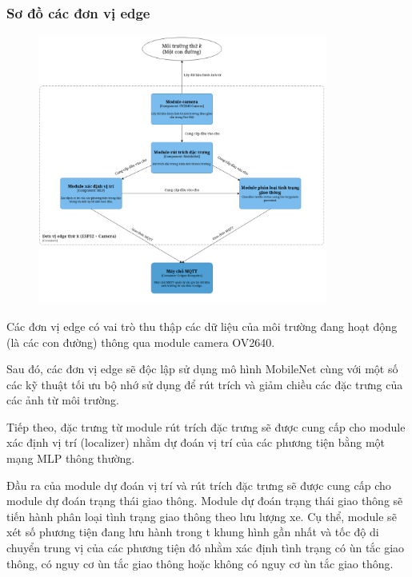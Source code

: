 \subsubsection{Sơ đồ các đơn vị edge}

\begin{figure}[H]
    \centering
    \includegraphics[width=0.85\textwidth]{image/modules.png}

    \label{fig:edges}
\end{figure}

\quad Các đơn vị edge có vai trò thu thập các dữ liệu của môi trường đang hoạt động (là các con đường) thông qua module camera OV2640. 

\quad Sau đó, các đơn vị edge sẽ độc lập sử dụng mô hình MobileNet cùng với một số các kỹ thuật tối ưu bộ nhớ sử dụng để rút trích và giảm chiều các đặc trưng của các ảnh từ môi trường.

\quad Tiếp theo, đặc trưng từ module rút trích đặc trưng sẽ được cung cấp cho module xác định vị trí (localizer) nhằm dự đoán vị trí của các phương tiện bằng một mạng MLP thông thường.

\quad Đầu ra của module dự đoán vị trí và rút trích đặc trưng sẽ được cung cấp cho module dự đoán trạng thái giao thông. Module dự đoán trạng thái giao thông sẽ tiến hành phân loại tình trạng giao thông theo lưu lượng xe. Cụ thể, module sẽ xét số phương tiện đang lưu hành trong t khung hình gần nhất và tốc độ di chuyển trung vị của các phương tiện đó nhằm xác định tình trạng có ùn tắc giao thông, có nguy cơ ùn tắc giao thông hoặc không có nguy cơ ùn tắc giao thông.

